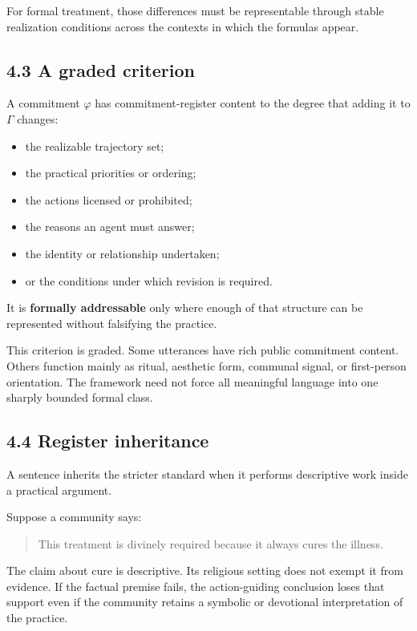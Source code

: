 \documentclass[
  11pt,
]{article}
\providecommand{\tightlist}{%
  \setlength{\itemsep}{0pt}\setlength{\parskip}{0pt}}
\begin{document}
For formal treatment, those differences must be representable through
stable realization conditions across the contexts in which the formulas
appear.

\subsection{4.3 A graded criterion}\label{a-graded-criterion}

A commitment \(\varphi\) has commitment-register content to the degree
that adding it to \(\Gamma\) changes:

\begin{itemize}
\tightlist
\item
  the realizable trajectory set;
\item
  the practical priorities or ordering;
\item
  the actions licensed or prohibited;
\item
  the reasons an agent must answer;
\item
  the identity or relationship undertaken;
\item
  or the conditions under which revision is required.
\end{itemize}

It is \textbf{formally addressable} only where enough of that structure
can be represented without falsifying the practice.

This criterion is graded. Some utterances have rich public commitment
content. Others function mainly as ritual, aesthetic form, communal
signal, or first-person orientation. The framework need not force all
meaningful language into one sharply bounded formal class.

\subsection{4.4 Register inheritance}\label{register-inheritance}

A sentence inherits the stricter standard when it performs descriptive
work inside a practical argument.

Suppose a community says:

\begin{quote}
This treatment is divinely required because it always cures the illness.
\end{quote}

The claim about cure is descriptive. Its religious setting does not
exempt it from evidence. If the factual premise fails, the
action-guiding conclusion loses that support even if the community
retains a symbolic or devotional interpretation of the practice.
\end{document}
